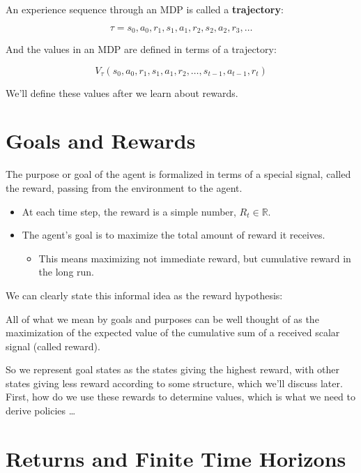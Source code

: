 \documentclass[11pt]{article}
\renewenvironment{quote}{\begin{shaded*}\begin{oldquote}}{\end{oldquote}\end{shaded*}}
\begin{document}
An experience sequence through an MDP is called a \textbf{trajectory}:

\begin{equation*}
\tau = s_0, a_0, r_1, s_1, a_1, r_2, s_2, a_2, r_3, \dots
\end{equation*}

And the values in an MDP are defined in terms of a trajectory:

\begin{equation*}
V_{\tau}(s_0, a_0, r_1, s_1, a_1, r_2, \dots, s_{t-1}, a_{t-1}, r_t)
\end{equation*}

We'll define these values after we learn about rewards.
\section{Goals and Rewards}
\label{sec:org4bf1615}

The purpose or goal of the agent is formalized in terms of a special signal, called the reward, passing from the environment to the agent.

\begin{itemize}
\item At each time step, the reward is a simple number, \(R_t \in \mathbb{R}\).
\item The agent’s goal is to maximize the total amount of reward it receives.

\begin{itemize}
\item This means maximizing not immediate reward, but cumulative reward in the long run.
\end{itemize}
\end{itemize}

We can clearly state this informal idea as the reward hypothesis:

\begin{quote}
All of what we mean by goals and purposes can be well thought of as the maximization of the expected value of the cumulative sum of a received scalar signal (called reward).
\end{quote}

So we represent goal states as the states giving the highest reward, with other states giving less reward according to some structure, which we'll discuss later.  First, how do we use these rewards to determine values, which is what we need to derive policies \ldots{}
\section{Returns and Finite Time Horizons}
\label{sec:orged52bac}
\end{document}
